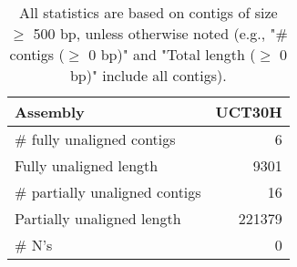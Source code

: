 \documentclass[12pt,a4paper]{article}
\begin{document}
\begin{table}[ht]
\begin{center}
\caption{All statistics are based on contigs of size $\geq$ 500 bp, unless otherwise noted (e.g., "\# contigs ($\geq$ 0 bp)" and "Total length ($\geq$ 0 bp)" include all contigs).}
\begin{tabular}{|l*{1}{|r}|}
\hline
Assembly & UCT30H \\ \hline
\# fully unaligned contigs & 6 \\ \hline
Fully unaligned length & 9301 \\ \hline
\# partially unaligned contigs & 16 \\ \hline
Partially unaligned length & 221379 \\ \hline
\# N's & 0 \\ \hline
\end{tabular}
\end{center}
\end{table}
\end{document}
